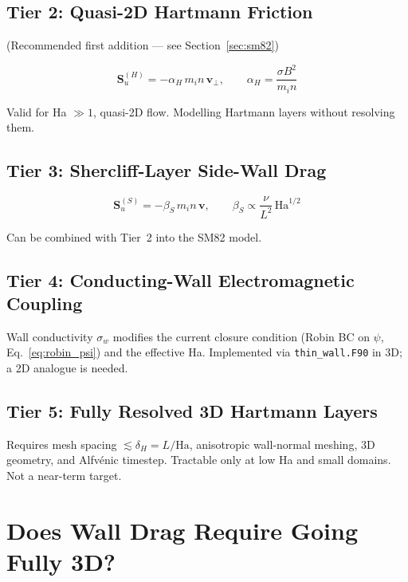 \documentclass[11pt,letterpaper]{article}
\begin{document}
\subsection{Tier 2: Quasi-2D Hartmann Friction}
(Recommended first addition --- see Section~\ref{sec:sm82})

\begin{equation}
  \mathbf{S}_{u}^{(H)} = -\alpha_H\, m_i n\, \mathbf{v}_\perp, \qquad
  \alpha_H = \frac{\sigma B^2}{m_i n}
  \label{eq:hartmann_drag}
\end{equation}

Valid for Ha $\gg 1$, quasi-2D flow.  Modelling Hartmann layers without
resolving them.

\subsection{Tier 3: Shercliff-Layer Side-Wall Drag}

\begin{equation}
  \mathbf{S}_{u}^{(S)} = -\beta_S\, m_i n\, \mathbf{v}, \qquad
  \beta_S \propto \frac{\nu}{L^2}\,\mathrm{Ha}^{1/2}
\end{equation}

Can be combined with Tier~2 into the SM82 model.

\subsection{Tier 4: Conducting-Wall Electromagnetic Coupling}

Wall conductivity $\sigma_w$ modifies the current closure condition
(Robin BC on $\psi$, Eq.~\eqref{eq:robin_psi}) and the effective Ha.
Implemented via \texttt{thin\_wall.F90} in 3D; a 2D analogue is needed.

\subsection{Tier 5: Fully Resolved 3D Hartmann Layers}

Requires mesh spacing $\lesssim \delta_H = L/\mathrm{Ha}$, anisotropic
wall-normal meshing, 3D geometry, and Alfv\'{e}nic timestep.  Tractable only
at low Ha and small domains.  Not a near-term target.

\section{Does Wall Drag Require Going Fully 3D?}
\end{document}
